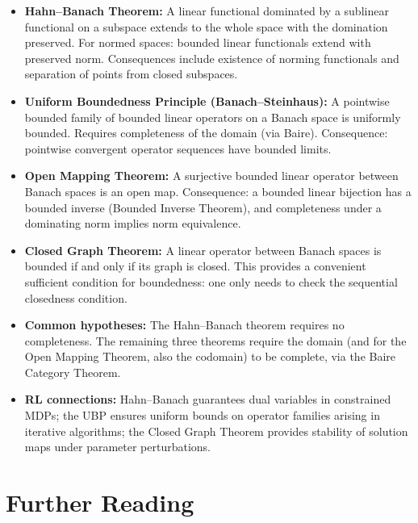 \documentclass[11pt,a4paper]{article}
\begin{document}
\begin{itemize}[leftmargin=2em,nosep]
    \item \textbf{Hahn--Banach Theorem:} A linear functional dominated
          by a sublinear functional on a subspace extends to the whole
          space with the domination preserved. For normed spaces: bounded
          linear functionals extend with preserved norm. Consequences
          include existence of norming functionals and separation of
          points from closed subspaces.
    \item \textbf{Uniform Boundedness Principle (Banach--Steinhaus):} A
          pointwise bounded family of bounded linear operators on a
          Banach space is uniformly bounded. Requires completeness of the
          domain (via Baire). Consequence: pointwise convergent operator
          sequences have bounded limits.
    \item \textbf{Open Mapping Theorem:} A surjective bounded linear
          operator between Banach spaces is an open map. Consequence: a
          bounded linear bijection has a bounded inverse (Bounded Inverse
          Theorem), and completeness under a dominating norm implies norm
          equivalence.
    \item \textbf{Closed Graph Theorem:} A linear operator between
          Banach spaces is bounded if and only if its graph is closed.
          This provides a convenient sufficient condition for
          boundedness: one only needs to check the sequential closedness
          condition.
    \item \textbf{Common hypotheses:} The Hahn--Banach theorem requires
          no completeness. The remaining three theorems require the
          domain (and for the Open Mapping Theorem, also the codomain)
          to be complete, via the Baire Category Theorem.
    \item \textbf{RL connections:} Hahn--Banach guarantees dual variables
          in constrained MDPs; the UBP ensures uniform bounds on
          operator families arising in iterative algorithms; the Closed
          Graph Theorem provides stability of solution maps under
          parameter perturbations.
\end{itemize}


\section{Further Reading}
\label{sec:further}
\end{document}
